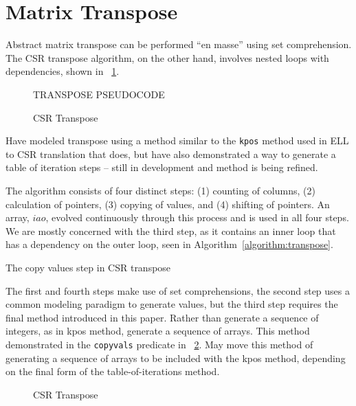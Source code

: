 \section{Matrix Transpose}
\label{sec:transpose}

Abstract matrix transpose can be performed ``en masse'' using set comprehension.  The CSR transpose algorithm, on the other hand, involves nested loops with dependencies, shown in \figurename~\ref{algo:transpose}.

\begin{figure}
TRANSPOSE PSEUDOCODE
\caption{CSR Transpose}
\label{algo:transpose}
\end{figure}

Have modeled transpose using a method similar to the \texttt{kpos} method used in ELL to CSR translation that does, but have also demonstrated a way to generate a table of iteration steps -- still in development and method is being refined.

The algorithm consists of four distinct steps: (1) counting of columns, (2) calculation of pointers, (3) copying of values, and (4) shifting of pointers.  An array, $iao$, evolved continuously through this process and is used in all four steps.  We are mostly concerned with the third step, as it contains an inner loop that has a dependency on the outer loop, seen in Algorithm~\ref{algorithm:transpose}.

\begin{algorithm}

\caption{The copy values step in CSR transpose}
\label{algorithm:transpose}
\end{algorithm}

The first and fourth steps make use of set comprehensions, the second step uses a common modeling paradigm to generate values, but the third step requires the final method introduced in this paper.  Rather than generate a sequence of integers, as in kpos method, generate a sequence of arrays.  This method demonstrated in the \texttt{copyvals} predicate in \figurename~\ref{model:transpose}.  May move this method of generating a sequence of arrays to be included with the kpos method, depending on the final form of the table-of-iterations method.

\begin{figure}

\caption{CSR Transpose}
\label{model:transpose}
\end{figure}